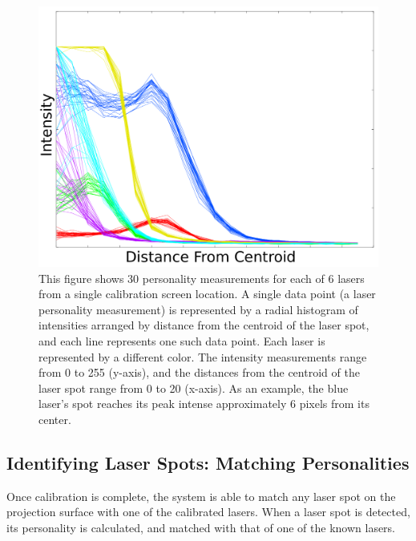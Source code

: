 \begin{figure}
\includegraphics[width=0.99\linewidth]{images/AllLaserPersonalities_OneSpot.png}

\vspace{-0.1in}
\caption[Laser personality training data]{\label{figure:six_laser_personalities} This figure shows 30
  personality measurements for each of 6 lasers from a single
  calibration screen location. A single data point (a laser
  personality measurement) is represented by a radial histogram of
  intensities arranged by distance from the centroid of the laser
  spot, and each line represents one such data point. Each laser is
  represented by a different color. The intensity measurements range
  from 0 to 255 (y-axis), and the distances from the centroid of the
  laser spot range from 0 to 20 (x-axis). As an example, the blue
  laser's spot reaches its peak intense approximately 6 pixels from
  its center.
}
\end{figure}


\subsection{Identifying Laser Spots: Matching Personalities}

Once calibration is complete, the system is able to match any laser
spot on the projection surface with one of the calibrated lasers.
When a laser spot is detected, its personality is calculated, and
matched with that of one of the known lasers.

